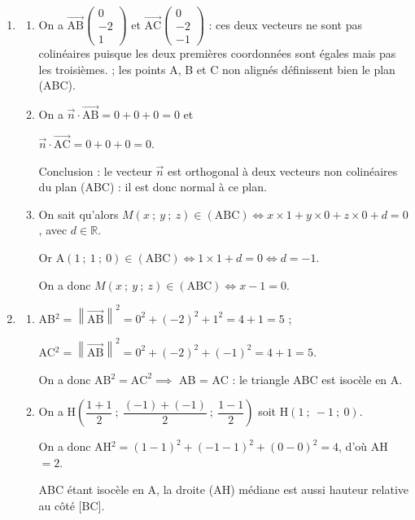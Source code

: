 \documentclass[10pt]{article}
\providecommand{\R}{\mathbb{R}}
\providecommand{\vect}[1]{\overrightarrow{#1}}
\begin{document}
\begin{enumerate}
On a donc B$(1~;~- 1~;~1) \in (d) \cap \mathcal{P}$.
\item 
	\begin{enumerate}
		\item 
		
		On a $\vect{\text{AB}}\begin{pmatrix}0\\-2\\1\end{pmatrix}$ et $\vect{\text{AC}}\begin{pmatrix}0\\-2\\- 1\end{pmatrix}$ : ces deux vecteurs ne sont pas colinéaires puisque les deux premières coordonnées sont égales mais pas les troisièmes. ; les points A, B et C non alignés définissent bien le plan (ABC).
		\item 
		On a $\vect{n} \cdot \vect{\text{AB}} = 0 + 0 + 0 = 0$ et 
		
$\vect{n} \cdot \vect{\text{AC}} = 0 + 0 + 0 = 0$.

Conclusion : le vecteur $\vect{n}$ est orthogonal à deux vecteurs non colinéaires du plan (ABC) : il est donc normal à ce plan.
		\item 
On sait qu'alors $M(x~;~y~;~z) \in (\text{ABC}) \iff x \times 1 + y\times 0 + z \times 0 + d = 0$, avec $d \in \R$.

Or A$(1~;~1~;~0) \in (\text{ABC}) \iff 1 \times 1 + d = 0  \iff d = - 1$.

On a donc $M(x~;~y~;~z) \in (\text{ABC}) \iff x - 1 = 0$.
	\end{enumerate}
\item 
	\begin{enumerate}
		\item 
AB$^2 = \left\|\vect{\text{AB}}\right\|^2 = 0^2 + (- 2)^2 + 1^2 = 4 + 1 = 5$ ;

AC$^2 = \left\|\vect{\text{AB}}\right\|^2 = 0^2 + (- 2)^2 + (- 1)^2 = 4 + 1 = 5$.

On a donc AB$^2 = \text{AC}^2 \implies $ AB = AC : le triangle ABC est isocèle en A.
		\item 
		On a H$\left(\dfrac{1+1}{2}~;~\dfrac{(- 1) + (- 1)}{2}~;~\dfrac{1 - 1}{2} \right)$ soit H$(1~;~- 1~;~0)$.
		
On a donc AH$^2 = (1 - 1)^2 + (- 1 - 1)^2 + (0 - 0)^2 = 4$, d'où AH $ = 2$.

ABC étant isocèle en A, la droite (AH) médiane est aussi hauteur relative au côté [BC].


\end{enumerate}
\end{enumerate}
\end{document}

